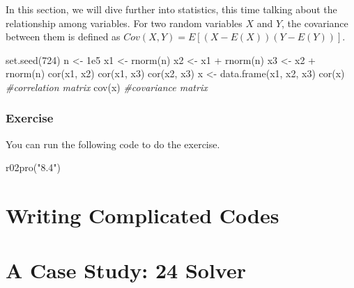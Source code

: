 \documentclass[
]{book}
\newenvironment{Shaded}{\begin{snugshade}}{\end{snugshade}}
\newcommand{\CommentTok}[1]{\textcolor[rgb]{0.56,0.35,0.01}{\textit{#1}}}
\newcommand{\DecValTok}[1]{\textcolor[rgb]{0.00,0.00,0.81}{#1}}
\newcommand{\FloatTok}[1]{\textcolor[rgb]{0.00,0.00,0.81}{#1}}
\newcommand{\FunctionTok}[1]{\textcolor[rgb]{0.00,0.00,0.00}{#1}}
\newcommand{\NormalTok}[1]{#1}
\newcommand{\OtherTok}[1]{\textcolor[rgb]{0.56,0.35,0.01}{#1}}
\newcommand{\SpecialCharTok}[1]{\textcolor[rgb]{0.00,0.00,0.00}{#1}}
\newcommand{\StringTok}[1]{\textcolor[rgb]{0.31,0.60,0.02}{#1}}
\begin{document}
In this section, we will dive further into statistics, this time talking about the relationship among variables. For two random variables \(X\) and \(Y\), the covariance between them is defined as \(Cov(X, Y) = E[(X-E(X))(Y-E(Y))]\).

\begin{Shaded}
\begin{Highlighting}[]
\FunctionTok{set.seed}\NormalTok{(}\DecValTok{724}\NormalTok{)}
\NormalTok{n }\OtherTok{\textless{}{-}} \FloatTok{1e5}
\NormalTok{x1 }\OtherTok{\textless{}{-}} \FunctionTok{rnorm}\NormalTok{(n)}
\NormalTok{x2 }\OtherTok{\textless{}{-}}\NormalTok{ x1 }\SpecialCharTok{+} \FunctionTok{rnorm}\NormalTok{(n)}
\NormalTok{x3 }\OtherTok{\textless{}{-}}\NormalTok{ x2 }\SpecialCharTok{+} \FunctionTok{rnorm}\NormalTok{(n)}
\FunctionTok{cor}\NormalTok{(x1, x2)}
\FunctionTok{cor}\NormalTok{(x1, x3)}
\FunctionTok{cor}\NormalTok{(x2, x3)}
\NormalTok{x }\OtherTok{\textless{}{-}} \FunctionTok{data.frame}\NormalTok{(x1, x2, x3)}
\FunctionTok{cor}\NormalTok{(x) }\CommentTok{\#correlation matrix}
\FunctionTok{cov}\NormalTok{(x) }\CommentTok{\#covariance matrix}
\end{Highlighting}
\end{Shaded}

\hypertarget{exercise-14}{%
\subsection{Exercise}\label{exercise-14}}

You can run the following code to do the exercise.

\begin{Shaded}
\begin{Highlighting}[]
\FunctionTok{r02pro}\NormalTok{(}\StringTok{"8.4"}\NormalTok{)}
\end{Highlighting}
\end{Shaded}

\hypertarget{write-code}{%
\chapter{Writing Complicated Codes}\label{write-code}}

\hypertarget{case-study}{%
\chapter{A Case Study: 24 Solver}\label{case-study}}

  
\end{document}
